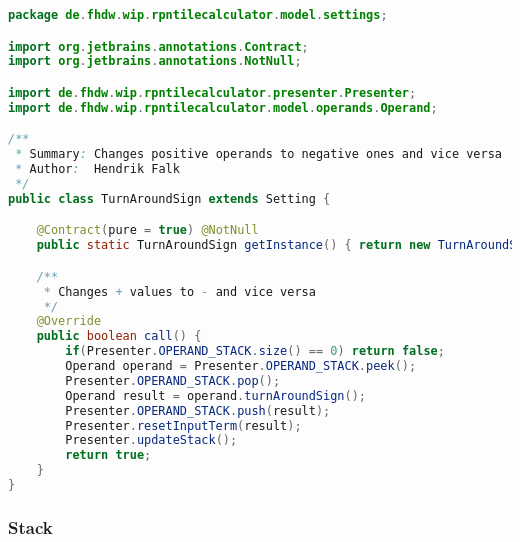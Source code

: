 \begin{lstlisting}[caption=TurnAroundSign (Falk),label=list:TurnAroundSign,language=Java]
package de.fhdw.wip.rpntilecalculator.model.settings;

import org.jetbrains.annotations.Contract;
import org.jetbrains.annotations.NotNull;

import de.fhdw.wip.rpntilecalculator.presenter.Presenter;
import de.fhdw.wip.rpntilecalculator.model.operands.Operand;

/**
 * Summary: Changes positive operands to negative ones and vice versa
 * Author:  Hendrik Falk
 */
public class TurnAroundSign extends Setting {

    @Contract(pure = true) @NotNull
    public static TurnAroundSign getInstance() { return new TurnAroundSign(); }

    /**
     * Changes + values to - and vice versa
     */
    @Override
    public boolean call() {
        if(Presenter.OPERAND_STACK.size() == 0) return false;
        Operand operand = Presenter.OPERAND_STACK.peek();
        Presenter.OPERAND_STACK.pop();
        Operand result = operand.turnAroundSign();
        Presenter.OPERAND_STACK.push(result);
        Presenter.resetInputTerm(result);
        Presenter.updateStack();
        return true;
    }
}
\end{lstlisting} 

\subsubsection{Stack}   

